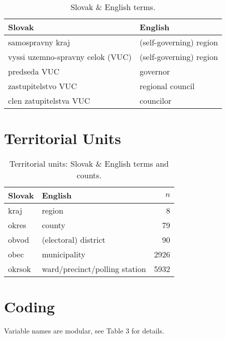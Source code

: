 \documentclass[11pt, a4paper]{article}
\begin{document}
\begin{table}[H]\footnotesize
	\label{tab:trans}
	\caption{Slovak \& English terms.}
	\begin{center}
		\begin{tabular}{ll}
			\toprule
			Slovak & English \\
			\midrule
			samospravny kraj 					& (self-governing) region 	\\
			vyssi uzemno-spravny celok (VUC) 	& (self-governing) region 	\\
			predseda VUC 						& governor 					\\
			zastupitelstvo VUC 					& regional council 			\\
			clen zatupitelstva VUC 				& councilor 				\\
			\bottomrule
		\end{tabular}
	\end{center}
\end{table}



\section{Territorial Units}


\begin{table}[H]\footnotesize
	\label{tab:territ}
	\caption{Territorial units: Slovak \& English terms and counts.}
	\begin{center}
		\begin{tabular}{l l r}
			\toprule
			Slovak & English & $n$ \\
			\midrule
			kraj	&	region 							&	8		\\
			okres	&	county 							&	79		\\
		 	obvod	&	(electoral) district 			&	90		\\
			obec 	&	municipality					&	2926	\\
			okrsok	&	ward/precinct/polling station 	&	5932	\\
			\bottomrule
		\end{tabular}
	\end{center}
\end{table}





\section{Coding}

Variable names are modular, see Table 3 for details.
\end{document}
